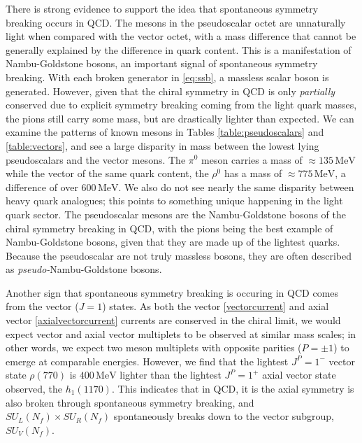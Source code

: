 \documentclass[aps,prd,onecolumn,showpacs,amsmath,amssymb,nofootinbib]{revtex4} \pdfoutput=1
\newcommand{\mev}{\mathrm{MeV}}
\begin{document}
There is strong evidence to support the idea that spontaneous symmetry breaking occurs in QCD. The mesons in the pseudoscalar octet are unnaturally light when compared with the vector octet, with a mass difference that cannot be generally explained by the difference in quark content. This is a manifestation of Nambu-Goldstone bosons, an important signal of spontaneous symmetry breaking. With each broken generator in \eqref{eq:ssb}, a massless scalar boson is generated. However, given that the chiral symmetry in QCD is only \textit{partially} conserved due to explicit symmetry breaking coming from the light quark masses, the pions still carry some mass, but are drastically lighter than expected. We can examine the patterns of known mesons in Tables \ref{table:pseudoscalars} and \ref{table:vectors}, and see a large disparity in mass between the lowest lying pseudoscalars and the vector mesons. The $\pi^0$ meson carries a mass of $\approx 135\,\mev$ while the vector of the same quark content, the $\rho^{0}$ has a mass of $\approx 775\,\mev$, a difference of over $600\,\mev$. We also do not see nearly the same disparity between heavy quark analogues; this points to something unique happening in the light quark sector. The pseudoscalar mesons are the Nambu-Goldstone bosons of the chiral symmetry breaking in QCD, with the pions being the best example of Nambu-Goldstone bosons, given that they are made up of the lightest quarks. Because the pseudoscalar are not truly massless bosons, they are often described as \textit{pseudo-}Nambu-Goldstone bosons. 

Another sign that spontaneous symmetry breaking is occuring in QCD comes from the vector ($J=1$) states. As both the vector \eqref{vectorcurrent} and axial vector \eqref{axialvectorcurrent} currents are conserved in the chiral limit, we would expect vector and axial vector multiplets to be observed at similar mass scales; in other words, we expect two meson multiplets with opposite parities ($P=\pm1$) to emerge at comparable energies. However, we find that the lightest $J^P = 1^{-}$ vector state $\rho(770)$ is $400\,\mev$ lighter than the lightest $J^P=1^{+}$ axial vector state observed, the $h_{1}(1170)$. This indicates that in QCD, it is the axial symmetry is also broken through spontaneous symmetry breaking, and ${S\!U}_L(N_f)\times {S\!U}_R(N_f)$ spontaneously breaks down to the vector subgroup, ${S\!U}_V(N_f)$.
\end{document}
